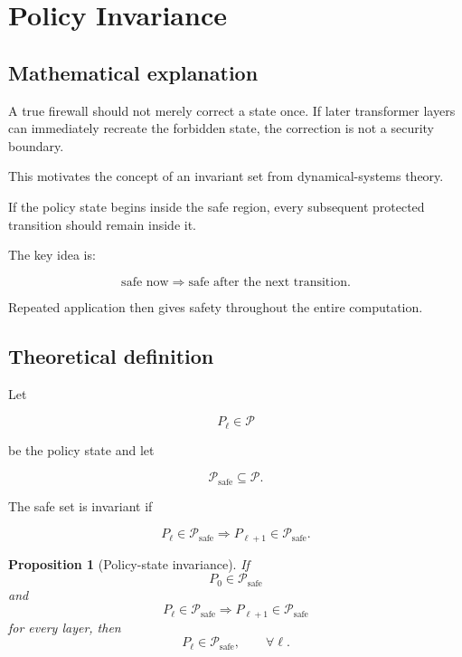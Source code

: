 \documentclass[11pt]{article}
\newcommand{\Psafe}{\mathcal{P}_{\mathrm{safe}}}
\newtheorem{proposition}{Proposition}
\begin{document}
\section{Policy Invariance}

\subsection*{Mathematical explanation}

A true firewall should not merely correct a state once. If later transformer
layers can immediately recreate the forbidden state, the correction is not a
security boundary.

This motivates the concept of an invariant set from dynamical-systems
theory.

If the policy state begins inside the safe region, every subsequent protected
transition should remain inside it.

The key idea is:

\begin{equation}
\text{safe now}
\Rightarrow
\text{safe after the next transition}.
\end{equation}

Repeated application then gives safety throughout the entire computation.

\subsection*{Theoretical definition}

Let

\begin{equation}
P_\ell\in\mathcal P
\end{equation}

be the policy state and let

\begin{equation}
\Psafe\subseteq\mathcal P.
\end{equation}

The safe set is invariant if

\begin{equation}
\boxed{
P_\ell\in\Psafe
\Longrightarrow
P_{\ell+1}\in\Psafe.
}
\end{equation}

\begin{proposition}[Policy-state invariance]
If
\begin{equation}
P_0\in\Psafe
\end{equation}
and
\begin{equation}
P_\ell\in\Psafe
\Longrightarrow
P_{\ell+1}\in\Psafe
\end{equation}
for every layer, then
\begin{equation}
\boxed{
P_\ell\in\Psafe,\qquad\forall\ell.
}
\end{equation}
\end{proposition}
\end{document}
